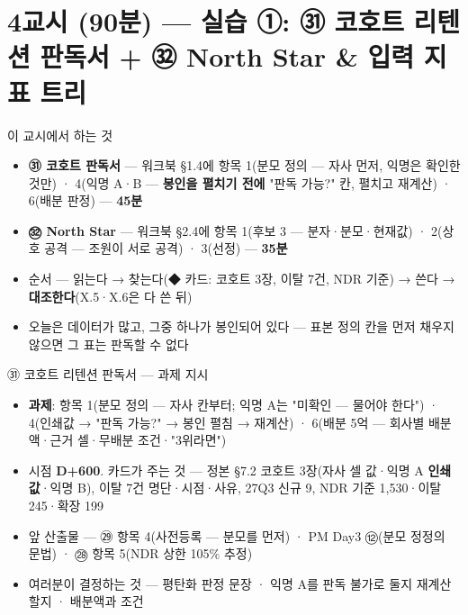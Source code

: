 \section{4교시 (90분) — 실습 ①: ㉛ 코호트 리텐션 판독서 + ㉜ North Star \& 입력 지표 트리}
\begin{frame}{이 교시에서 하는 것}
\begin{itemize}
\item \textbf{㉛ 코호트 판독서} — 워크북 §1.4에 항목 1(분모 정의 — 자사 먼저, 익명은 확인한 것만) · 4(익명 A·B — \textbf{봉인을 펼치기 전에} "판독 가능?" 칸, 펼치고 재계산) · 6(배분 판정) — \textbf{45분}
\item \textbf{㉜ North Star} — 워크북 §2.4에 항목 1(후보 3 — 분자·분모·현재값) · 2(상호 공격 — 조원이 서로 공격) · 3(선정) — \textbf{35분}
\item 순서 — 읽는다 → 찾는다(◆ 카드: 코호트 3장, 이탈 7건, NDR 기준) → 쓴다 → \textbf{대조한다}(X.5·X.6은 다 쓴 뒤)
\item 오늘은 데이터가 많고, 그중 하나가 봉인되어 있다 — 표본 정의 칸을 먼저 채우지 않으면 그 표는 판독할 수 없다
\end{itemize}
\end{frame}

\begin{frame}{㉛ 코호트 리텐션 판독서 — 과제 지시}
\begin{itemize}
\item \textbf{과제}: 항목 1(분모 정의 — 자사 칸부터; 익명 A는 "미확인 — 물어야 한다") · 4(인쇄값 → "판독 가능?" → 봉인 펼침 → 재계산) · 6(배분 5억 — 회사별 배분액·근거 셀·무배분 조건·"3위라면")
\item 시점 \textbf{D+600}. 카드가 주는 것 — 정본 §7.2 코호트 3장(자사 셀 값·익명 A \textbf{인쇄값}·익명 B), 이탈 7건 명단·시점·사유, 27Q3 신규 9, NDR 기준 1,530·이탈 245·확장 199
\item 앞 산출물 — ㉙ 항목 4(사전등록 — 분모를 먼저) · PM Day3 ⑫(분모 정정의 문법) · ㉘ 항목 5(NDR 상한 105\% 추정)
\item 여러분이 결정하는 것 — 평탄화 판정 문장 · 익명 A를 판독 불가로 둘지 재계산할지 · 배분액과 조건
\end{itemize}
\end{frame}

